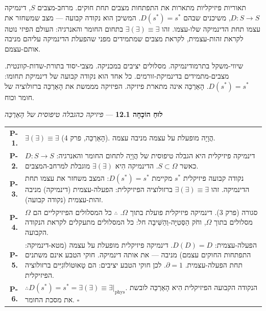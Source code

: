 \documentclass[10pt, openany, oneside]{book}
\renewcommand{\footnotesize}{\fontsize{8.5}{11}\selectfont}
\begin{document}

\noindent תאוריות פיזיקליות מתארות את התפתחות מצבים תחת חוקים. מרחב-מצבים $S$, דינמיקה $D: S \to S$, משיכנים שבהם $D(s^*) = s^*$. המשיכן הוא נקודה קבועה — מצב שמשחזר את עצמו תחת הדינמיקה שלו-עצמו. זהו $\exists(\exists) \equiv \exists$ בתחום החומר והאנרגיה: העולם הפיזי נוטה לקראת זהות-עצמית, לקראת מצבים שמתמידים מפני שהפעלת הדינמיקה עליהם מניבה אותם-עצמם.

שיווי-משקל בתרמודינמיקה. מסלולים יציבים במכניקה. מצבי-יסוד בתורת-שדות-קוונטית. מצבים-מתמידים בדינמיקת-זורמים. כל אחד הוא נקודה קבועה של דינמיקת תחומו: $D(s^*) = s^*$. הָאַרְכֵּה אינה מתארת פיזיקה. הפיזיקה מממשת את הָאַרְכֵּה ברזולוציה של חומר וכוח.

\vspace{0.5em}

\textbf{לוּחַ הוֹכָחָה 12.1} --- \textit{פיזיקה כהגבלה טיפוסית של הָאַרְכֵּה}

\vspace{0.5em}

{\footnotesize
\noindent\begin{tabular}{r p{}}
\textbf{P-1.} & $\exists(\exists) \equiv \exists$ (הָאַרְכֵּה, פרק 4). הֲוָיָה מופעלת על עצמה מניבה עצמה. \\[0.3em]
\textbf{P-2.} & דינמיקה פיזיקלית היא הגבלה טיפוסית של הֲוָיָה לתחום החומר והאנרגיה: $D: S \to S$ כאשר $S \subset \Omega$. הדינמיקה הִיא $\exists(\exists)$ מוגבלת למרחב-המצבים. \\[0.3em]
\textbf{P-3.} & נקודה קבועה פיזיקלית $s^*$ מקיימת $D(s^*) = s^*$: המצב משחזר את עצמו תחת הדינמיקה. זהו $\exists(\exists) \equiv \exists$ ברזולוציה הפיזיקלית: הפעלה-עצמית (דינמיקה) מניבה זהות-עצמית (נקודה קבועה). \\[0.3em]
\textbf{P-4.} & $\Omega$ סגורה (פרק 3). דינמיקה פיזיקלית פועלת בתוך $\Omega$. $\therefore$ כל המסלולים הפיזיקליים הם מסלולים בתוך $\Omega$, וחֹק הַסְּטִיָּה-וְהַשִּׁיבָה חל: כל המסלולים מתעקלים לקראת הנקודה הקבועה. \\[0.3em]
\textbf{P-5.} & הפעלה-עצמית: $D(D) = D$. דינמיקה פיזיקלית מופעלת על עצמה (מטא-דינמיקה: התפתחות החוקים עצמם) מניבה — את אותה דינמיקה. חוקי הטבע אינם משתנים תחת הפעלה-עצמית. $\partial = 1$. לכן חוקי הטבע יציבים: הם טָאוּטוֹלוֹגִיִּים ברזולוציה הפיזיקלית. \\[0.3em]
\textbf{P-6.} & $\therefore D(s^*) = s^* = \exists(\exists) \equiv \exists|_{\text{phys}}$. הנקודה הקבועה הפיזיקלית הִיא הָאַרְכֵּה לובשת את מסכת החומר. $\square$ \\[0.3em]
\end{tabular}
}
\end{document}
